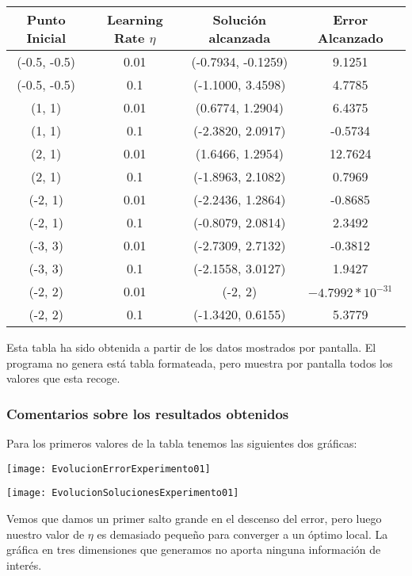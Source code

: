 \documentclass[11pt]{article}
\begin{document}
\begin{center}
    \begin{tabular}{| c | c | c | c |}
        Punto Inicial & Learning Rate $\eta$ & Solución alcanzada & Error Alcanzado \\
        \hline
        (-0.5, -0.5) & 0.01 & (-0.7934, -0.1259) & 9.1251\\
        (-0.5, -0.5) & 0.1 & (-1.1000, 3.4598) & 4.7785 \\
        (1, 1) & 0.01 & (0.6774, 1.2904) & 6.4375 \\
        (1, 1) & 0.1 & (-2.3820, 2.0917) & -0.5734 \\
        (2, 1) & 0.01 & (1.6466, 1.2954) & 12.7624 \\
        (2, 1) & 0.1 & (-1.8963,  2.1082) & 0.7969 \\
        (-2,  1) & 0.01 & (-2.2436,  1.2864) & -0.8685 \\
        (-2,  1) & 0.1 & (-0.8079, 2.0814) & 2.3492 \\
        (-3,  3) & 0.01 & (-2.7309,  2.7132) & -0.3812 \\
        (-3,  3) & 0.1 & (-2.1558,  3.0127) & 1.9427 \\
        (-2,  2) & 0.01 & (-2,  2) & $-4.7992 * 10^{-31}$ \\
        (-2,  2) & 0.1 & (-1.3420, 0.6155) & 5.3779 \\
        \hline
    \end{tabular}

\end{center}

Esta tabla ha sido obtenida a partir de los datos mostrados por pantalla. El programa no genera está tabla formateada, pero muestra por pantalla todos los valores que esta recoge.

\subsubsection{Comentarios sobre los resultados obtenidos}

Para los primeros valores de la tabla tenemos las siguientes dos gráficas:

\texttt{[image: EvolucionErrorExperimento01]}

\texttt{[image: EvolucionSolucionesExperimento01]}

Vemos que damos un primer salto grande en el descenso del error, pero luego nuestro valor de $\eta$ es demasiado pequeño para converger a un óptimo local. La gráfica en tres dimensiones que generamos no aporta ninguna información de interés.
\end{document}
